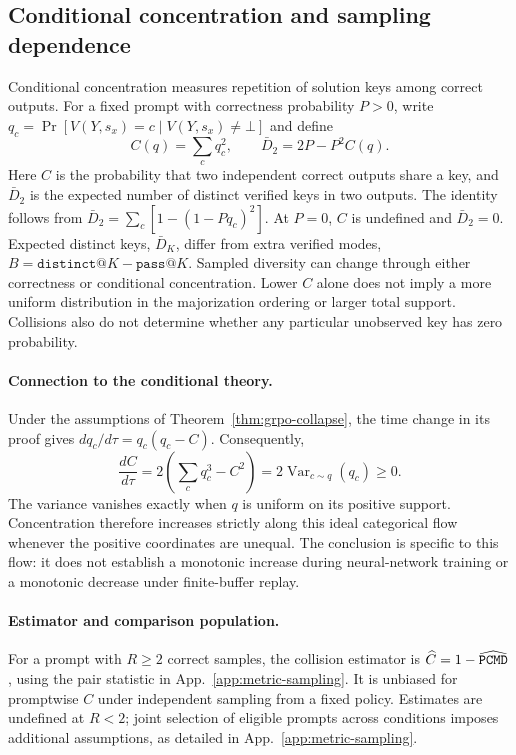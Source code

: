 \subsection{Conditional concentration and sampling dependence}
\label{app:conditional-concentration}

Conditional concentration measures repetition of solution keys among correct
outputs. For a fixed prompt with correctness probability $P>0$, write
$q_c=\Pr[V(Y,s_x)=c\mid V(Y,s_x)\ne\bot]$ and define
\begin{equation}
 C(q)=\sum_c q_c^2,\qquad \bar D_2=2P-P^2C(q).
 \label{eq:collision-breadth-bridge}
\end{equation}
Here $C$ is the probability that two independent correct outputs share a
key, and $\bar D_2$ is the expected number of distinct verified keys in two
outputs. The identity follows from
$\bar D_2=\sum_c[1-(1-Pq_c)^2]$. At $P=0$, $C$ is undefined and
$\bar D_2=0$. Expected distinct keys, $\bar D_K$, differ from extra verified
modes, $B=\texttt{distinct@}K-\texttt{pass@}K$. Sampled diversity can change
through either correctness or conditional concentration. Lower $C$ alone
does not imply a more uniform distribution in the majorization ordering
or larger total support. Collisions also do not determine whether any
particular unobserved key has zero probability.

\paragraph{Connection to the conditional theory.}
Under the assumptions of Theorem~\ref{thm:grpo-collapse}, the time change in
its proof gives $dq_c/d\tau=q_c(q_c-C)$. Consequently,
\begin{equation}
 \frac{dC}{d\tau}
 =2\left(\sum_c q_c^3-C^2\right)
 =2\operatorname{Var}_{c\sim q}(q_c)\ge0.
 \label{eq:collision-flow}
\end{equation}
The variance vanishes exactly when $q$ is uniform on its positive support.
Concentration therefore increases strictly along this ideal categorical
flow whenever the positive coordinates are unequal. The conclusion is
specific to this flow: it does not establish a monotonic increase during
neural-network training or a monotonic decrease under finite-buffer replay.

\paragraph{Estimator and comparison population.}
For a prompt with $R\ge2$ correct samples, the collision estimator is
$\widehat C=1-\widehat{\texttt{PCMD}}$, using the pair statistic in
App.~\ref{app:metric-sampling}. It is unbiased for promptwise $C$ under
independent sampling from a fixed policy. Estimates are undefined at $R<2$;
joint selection of eligible prompts across conditions imposes additional
assumptions, as detailed in App.~\ref{app:metric-sampling}.

